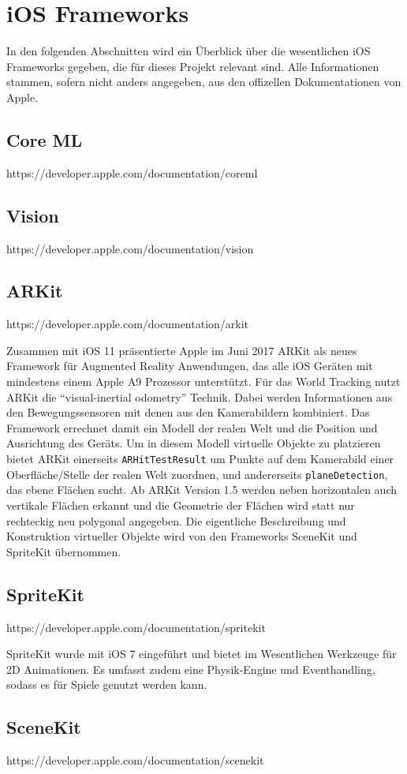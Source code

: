 \section{iOS Frameworks}
In den folgenden Abschnitten wird ein Überblick über die wesentlichen iOS Frameworks gegeben, die für dieses Projekt relevant sind. Alle Informationen stammen, sofern nicht anders angegeben, aus den offizellen Dokumentationen von Apple. %

\subsection{Core ML}
https://developer.apple.com/documentation/coreml

\subsection{Vision}
https://developer.apple.com/documentation/vision

\subsection{ARKit}
https://developer.apple.com/documentation/arkit

Zusammen mit iOS 11 präsentierte Apple im Juni 2017 ARKit als neues Framework für Augmented Reality Anwendungen, das alle iOS Geräten mit mindestens einem Apple A9 Prozessor unterstützt. Für das World Tracking nutzt ARKit die "`visual-inertial odometry"' Technik. Dabei werden Informationen aus den Bewegungssensoren mit denen aus den Kamerabildern kombiniert. Das Framework errechnet damit ein Modell der realen Welt und die Position und Ausrichtung des Geräts. Um in diesem Modell virtuelle Objekte zu platzieren bietet ARKit einerseits \texttt{ARHitTestResult} um Punkte auf dem Kamerabild einer Oberfläche/Stelle der realen Welt zuordnen, und andererseits \texttt{planeDetection}, das ebene Flächen sucht. Ab ARKit Version 1.5 werden neben horizontalen auch vertikale Flächen erkannt und die Geometrie der Flächen wird statt nur rechteckig neu polygonal angegeben. Die eigentliche Beschreibung und Konstruktion virtueller Objekte wird von den Frameworks SceneKit und SpriteKit übernommen.

\subsection{SpriteKit}
https://developer.apple.com/documentation/spritekit

SpriteKit wurde mit iOS 7 eingeführt und bietet im Wesentlichen Werkzeuge für 2D Animationen. Es umfasst zudem eine Physik-Engine und Eventhandling, sodass es für Spiele genutzt werden kann.

\subsection{SceneKit}
https://developer.apple.com/documentation/scenekit
